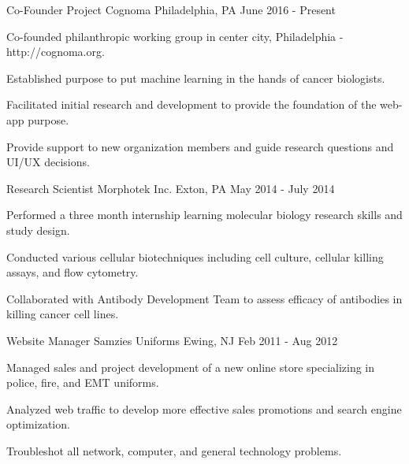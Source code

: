 

\begin{cventries}

  \cventry
    {Co-Founder} %
    {Project Cognoma} %
    {Philadelphia, PA} %
    {June 2016 - Present} %
    {
      \begin{cvitems} %
        \item {Co-founded philanthropic working group in center city,
               Philadelphia - http://cognoma.org.}
        \item {Established purpose to put machine learning in the hands of
               cancer biologists.}
        \item {Facilitated initial research and development to provide the
               foundation of the web-app purpose.}
        \item {Provide support to new organization members and guide research
               questions and UI/UX decisions.}
      \end{cvitems}
    }

  \cventry
    {Research Scientist} %
    {Morphotek Inc.} %
    {Exton, PA} %
    {May 2014 - July 2014} %
    {
      \begin{cvitems} %
        \item {Performed a three month internship learning molecular biology
               research skills and study design.}
        \item {Conducted various cellular biotechniques including cell culture,
               cellular killing assays, and flow cytometry.}
        \item {Collaborated with Antibody Development Team to assess efficacy
               of antibodies in killing cancer cell lines.}
      \end{cvitems}
    }

  \cventry
    {Website Manager} %
    {Samzies Uniforms} %
    {Ewing, NJ} %
    {Feb 2011 - Aug 2012} %
    {
      \begin{cvitems} %
        \item {Managed sales and project development of a new online store
               specializing in police, fire, and EMT uniforms.}
        \item {Analyzed web traffic to develop more effective sales promotions
               and search engine optimization.}
        \item {Troubleshot all network, computer, and general technology
               problems.}
      \end{cvitems}
    }
\end{cventries}
